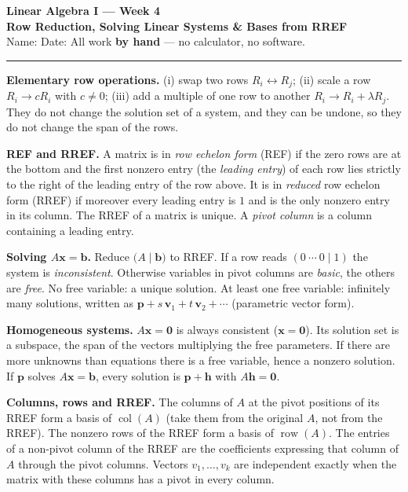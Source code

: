 \documentclass[11pt]{article}
\begin{document}
{\Large\bfseries\color{ink} Linear Algebra I --- Week 4}\\[2pt]
{\large\bfseries\color{ink} Row Reduction, Solving Linear Systems \& Bases from RREF}\\[3pt]
{\small Name: \underline{\hspace{5cm}}\hfill Date: \underline{\hspace{3cm}}\qquad All work \textbf{by hand} --- no calculator, no software.}
\vspace{4pt}\hrule\vspace{8pt}

\begin{tcolorbox}[colback=soft,colframe=ink,title={\bfseries Key Facts}]
\textbf{Elementary row operations.} (i) swap two rows $R_i\leftrightarrow R_j$; (ii) scale a row $R_i\to cR_i$ with $c\neq0$; (iii) add a multiple of one row to another $R_i\to R_i+\lambda R_j$. They do not change the solution set of a system, and they can be undone, so they do not change the span of the rows.

\textbf{REF and RREF.} A matrix is in \emph{row echelon form} (REF) if the zero rows are at the bottom and the first nonzero entry (the \emph{leading entry}) of each row lies strictly to the right of the leading entry of the row above. It is in \emph{reduced} row echelon form (RREF) if moreover every leading entry is $1$ and is the only nonzero entry in its column. The RREF of a matrix is unique. A \emph{pivot column} is a column containing a leading entry.

\textbf{Solving $A\mathbf x=\mathbf b$.} Reduce $\bigl(A\mid\mathbf b\bigr)$ to RREF. If a row reads $(0\ \cdots\ 0\mid1)$ the system is \emph{inconsistent}. Otherwise variables in pivot columns are \emph{basic}, the others are \emph{free}. No free variable: a unique solution. At least one free variable: infinitely many solutions, written as $\mathbf p+s\,\mathbf v_1+t\,\mathbf v_2+\cdots$ (parametric vector form).

\textbf{Homogeneous systems.} $A\mathbf x=\mathbf 0$ is always consistent ($\mathbf x=\mathbf 0$). Its solution set is a subspace, the span of the vectors multiplying the free parameters. If there are more unknowns than equations there is a free variable, hence a nonzero solution. If $\mathbf p$ solves $A\mathbf x=\mathbf b$, every solution is $\mathbf p+\mathbf h$ with $A\mathbf h=\mathbf 0$.

\textbf{Columns, rows and RREF.} The columns of $A$ at the pivot positions of its RREF form a basis of $\operatorname{col}(A)$ (take them from the original $A$, not from the RREF). The nonzero rows of the RREF form a basis of $\operatorname{row}(A)$. The entries of a non-pivot column of the RREF are the coefficients expressing that column of $A$ through the pivot columns. Vectors $v_1,\dots,v_k$ are independent exactly when the matrix with these columns has a pivot in every column.
\end{tcolorbox}
\end{document}
